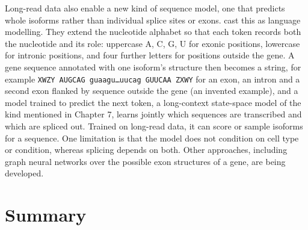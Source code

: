 Long-read data also enable a new kind of sequence model, one that predicts whole isoforms rather than individual splice sites or exons. \citet{saberi2024} cast this as language modelling. They extend the nucleotide alphabet so that each token records both the nucleotide and its role: uppercase A, C, G, U for exonic positions, lowercase for intronic positions, and four further letters for positions outside the gene. A gene sequence annotated with one isoform's structure then becomes a string, for example \texttt{XWZY\,AUGCAG\,guaagu\ldots{}uucag\,GUUCAA\,ZXWY} for an exon, an intron and a second exon flanked by sequence outside the gene (an invented example), and a model trained to predict the next token, a long-context state-space model of the kind mentioned in Chapter 7, learns jointly which sequences are transcribed and which are spliced out. Trained on long-read data, it can score or sample isoforms for a sequence. One limitation is that the model does not condition on cell type or condition, whereas splicing depends on both. Other approaches, including graph neural networks over the possible exon structures of a gene, are being developed.

\section{Summary}

